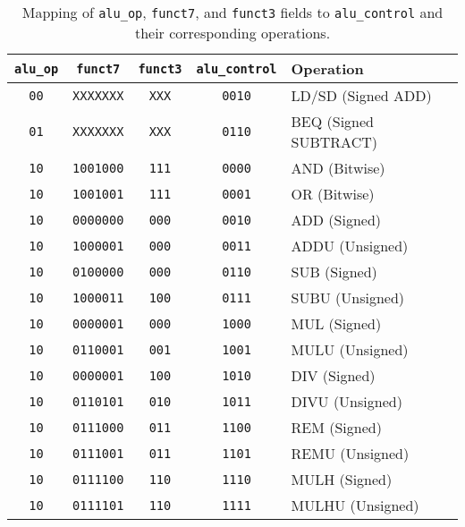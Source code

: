 \documentclass[12pt]{article}
\begin{document}
\begin{table}[ht!]
    \centering
    \renewcommand{\arraystretch}{1.1}
    \setlength{\tabcolsep}{4pt}
    \begin{tabular}{|c|c|c|c|l|}
        \hline
        \textbf{\texttt{alu\_op}} & \textbf{\texttt{funct7}} & \textbf{\texttt{funct3}} & \textbf{\texttt{alu\_control}} & \textbf{Operation} \\
        \hline
        \texttt{00} & \texttt{XXXXXXX} & \texttt{XXX} & \texttt{0010} & LD/SD (Signed ADD) \\
        \texttt{01} & \texttt{XXXXXXX} & \texttt{XXX} & \texttt{0110} & BEQ (Signed SUBTRACT) \\
        \texttt{10} & \texttt{1001000} & \texttt{111} & \texttt{0000} & AND (Bitwise) \\
        \texttt{10} & \texttt{1001001} & \texttt{111} & \texttt{0001} & OR (Bitwise) \\
        \texttt{10} & \texttt{0000000} & \texttt{000} & \texttt{0010} & ADD (Signed) \\
        \texttt{10} & \texttt{1000001} & \texttt{000} & \texttt{0011} & ADDU (Unsigned) \\
        \texttt{10} & \texttt{0100000} & \texttt{000} & \texttt{0110} & SUB (Signed) \\
        \texttt{10} & \texttt{1000011} & \texttt{100} & \texttt{0111} & SUBU (Unsigned) \\
        \texttt{10} & \texttt{0000001} & \texttt{000} & \texttt{1000} & MUL (Signed) \\
        \texttt{10} & \texttt{0110001} & \texttt{001} & \texttt{1001} & MULU (Unsigned) \\
        \texttt{10} & \texttt{0000001} & \texttt{100} & \texttt{1010} & DIV (Signed) \\
        \texttt{10} & \texttt{0110101} & \texttt{010} & \texttt{1011} & DIVU (Unsigned) \\
        \texttt{10} & \texttt{0111000} & \texttt{011} & \texttt{1100} & REM (Signed) \\
        \texttt{10} & \texttt{0111001} & \texttt{011} & \texttt{1101} & REMU (Unsigned) \\
        \texttt{10} & \texttt{0111100} & \texttt{110} & \texttt{1110} & MULH (Signed) \\
        \texttt{10} & \texttt{0111101} & \texttt{110} & \texttt{1111} & MULHU (Unsigned) \\
        \hline
    \end{tabular}
    \caption{Mapping of \texttt{alu\_op}, \texttt{funct7}, and \texttt{funct3} fields to \texttt{alu\_control} and their corresponding operations.}
    \label{tab:alu_control_mapping}
\end{table}
\end{document}
